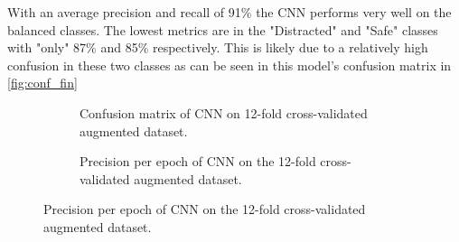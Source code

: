 With an average precision and recall of 91\% the CNN performs very well on the balanced classes. The lowest metrics are in the "Distracted" and "Safe" classes with "only" 87\% and 85\% respectively. This is likely due to a relatively high confusion in these two classes as can be seen in this model's confusion matrix in \autoref{fig:conf_fin}
\begin{figure}[H]
    \centering
    \begin{subfigure}{0.49\textwidth}
        \centering
        \caption{Confusion matrix of CNN on 12-fold cross-validated augmented dataset.}
        \label{fig:conf_fin}
    \end{subfigure}
    \hfill
    \begin{subfigure}{0.49\textwidth}
        \centering
        \caption{Precision per epoch of CNN on the 12-fold cross-validated augmented dataset.}
        \label{fig:prec}
    \end{subfigure}
\end{figure}
